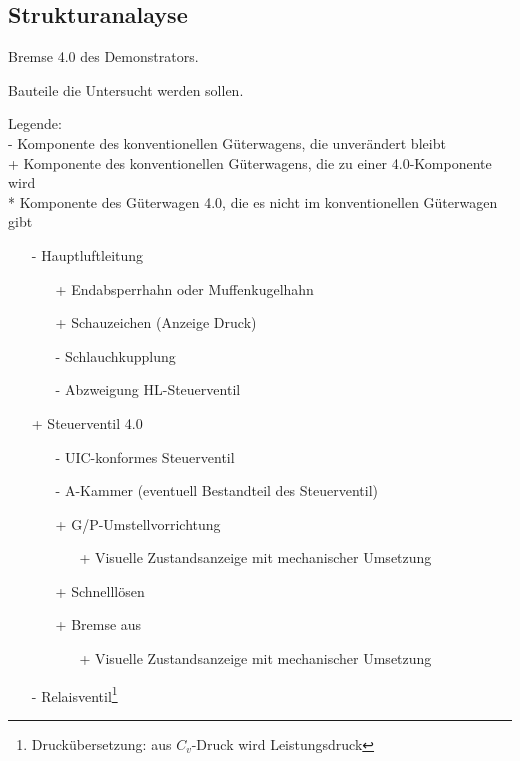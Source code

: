\subsection{Strukturanalayse}
\gls{Bremse 4.0} des Demonstrators.\par
Bauteile die Untersucht werden sollen.\par
Legende: \\
- Komponente des konventionellen \gls{Güterwagens}, die unverändert bleibt\\
+ Komponente des konventionellen \gls{Güterwagens}, die zu einer 4.0-Komponente wird\\
\** Komponente des Güterwagen 4.0, die es nicht im konventionellen Güterwagen gibt\par
\begin{itemize}
    \item[-] Hauptluftleitung
    \begin{itemize}
        \item[+] Endabsperrhahn oder Muffenkugelhahn
        \item[+] Schauzeichen (Anzeige Druck)
        \item[-] Schlauchkupplung
        \item[-] Abzweigung HL-Steuerventil
    \end{itemize}
    \item[+] Steuerventil 4.0
    \begin{itemize}
        \item[-] UIC-konformes Steuerventil
        \item[-] A-Kammer (eventuell Bestandteil des Steuerventil)
        \item[+] G/P-Umstellvorrichtung
        \begin{itemize}
            \item[+] Visuelle Zustandsanzeige mit mechanischer Umsetzung
        \end{itemize}
        \item[+] Schnelllösen
        \item[+] Bremse aus
        \begin{itemize}
            \item[+] Visuelle Zustandsanzeige mit mechanischer Umsetzung
        \end{itemize}
    \end{itemize}
    \item[-] Relaisventil\footnote{Druckübersetzung: aus $C_v$-Druck wird Leistungsdruck}
    \begin{itemize}

\end{itemize}
\end{itemize}
